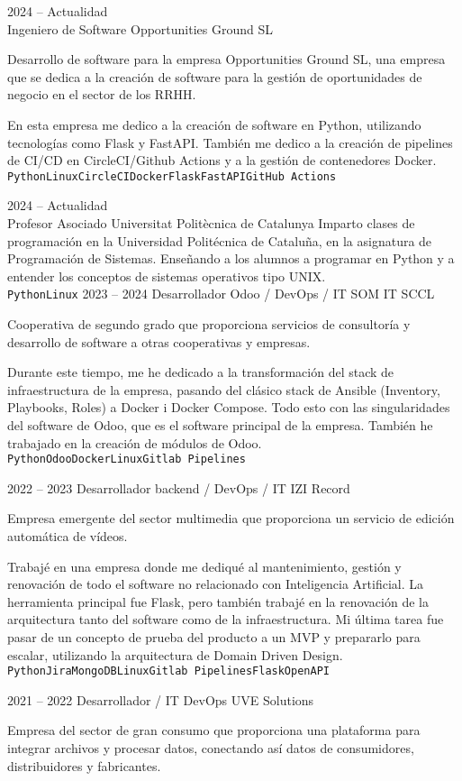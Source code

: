 \documentclass[9pt]{developercv} %
\begin{document}
\begin{entrylist}
	\entry
	{2024 -- Actualidad\\}
	{Ingeniero de Software}
	{Opportunities Ground SL}
	{ 
		Desarrollo de software para la empresa Opportunities Ground SL, una empresa que se dedica a la creación de software para la gestión de oportunidades de negocio en el sector de los RRHH.
		
		En esta empresa me dedico a la creación de software en Python, utilizando tecnologías como Flask y FastAPI. También me dedico a la creación de pipelines de CI/CD en CircleCI/Github Actions y a la gestión de contenedores Docker.
		\\ \texttt{Python}\slashsep\texttt{Linux}\slashsep\texttt{CircleCI}\slashsep\texttt{Docker}\slashsep\texttt{Flask}\slashsep\texttt{FastAPI}\slashsep\texttt{GitHub Actions}
		}
	\entry
		{2024 -- Actualidad\\}
		{Profesor Asociado}
		{Universitat Politècnica de Catalunya}
		{ 
			Imparto clases de programación en la Universidad Politécnica de Cataluña, en la asignatura de Programación de Sistemas. Enseñando a los alumnos a programar en Python y a entender los conceptos de sistemas operativos tipo UNIX.
		\\ \texttt{Python}\slashsep\texttt{Linux}
		}
		\entry
		{2023 -- 2024}
		{Desarrollador Odoo / DevOps / IT}
		{SOM IT SCCL}
		{Cooperativa de segundo grado que proporciona servicios de consultoría y desarrollo de software a otras cooperativas y empresas.

		Durante este tiempo, me he dedicado a la transformación del stack de infraestructura de la empresa, pasando del clásico stack de Ansible (Inventory, Playbooks, Roles) a Docker i Docker Compose. Todo esto con las singularidades del software de Odoo, que es el software principal de la empresa. También he trabajado en la creación de módulos de Odoo.
		\\ \texttt{Python}\slashsep\texttt{Odoo}\slashsep\texttt{Docker}\slashsep\texttt{Linux}\slashsep\texttt{Gitlab Pipelines}
		}
	\entry
		{2022 -- 2023}
		{Desarrollador backend / DevOps / IT}
		{IZI Record}
		{Empresa emergente del sector multimedia que proporciona un servicio de edición automática de vídeos.

		Trabajé en una empresa donde me dediqué al mantenimiento, gestión y renovación de todo el software no relacionado con Inteligencia Artificial. La herramienta principal fue Flask, pero también trabajé en la renovación de la arquitectura tanto del software como de la infraestructura. Mi última tarea fue pasar de un concepto de prueba del producto a un MVP y prepararlo para escalar, utilizando la arquitectura de Domain Driven Design.
		\\ \texttt{Python}\slashsep\texttt{Jira}\slashsep\texttt{MongoDB}\slashsep\texttt{Linux}\slashsep\texttt{Gitlab Pipelines}\slashsep\texttt{Flask}\slashsep\texttt{OpenAPI}}
	\entry
		{2021 -- 2022}
		{Desarrollador / IT DevOps}
		{UVE Solutions}
		{Empresa del sector de gran consumo que proporciona una plataforma para integrar archivos y procesar datos, conectando así datos de consumidores, distribuidores y fabricantes.

}
\end{entrylist}
\end{document}
